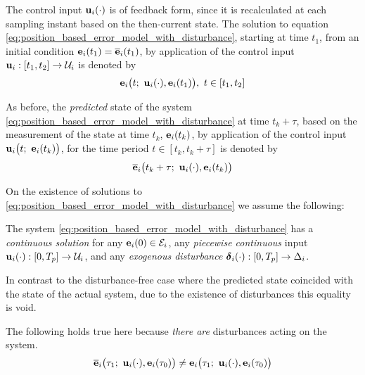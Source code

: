 The control input $\bm{\mathbf{u}}_i(\cdot)$ is of feedback form,
since it is recalculated at each sampling instant based on the then-current
state. The solution to equation \eqref{eq:position_based_error_model_with_disturbance}, starting at time
$t_1$, from an initial condition $\bm{\mathbf{e}}_i(t_1) = \overline{\bm{\mathbf{e}}}_i(t_1)$,
by application of the control input $\bm{\mathbf{u}}_i : [t_1, t_2] \to \mathcal{U}_i$
is denoted by
\begin{align}
  \bm{\mathbf{e}}_i\big(t;\ \bm{\mathbf{u}}_i(\cdot), \bm{\mathbf{e}}_i(t_1)\big),\ t \in [t_1, t_2]
\end{align}

As before, the \textit{predicted} state of the system
\eqref{eq:position_based_error_model_with_disturbance}
at time $t_k + \tau$, based on the measurement of the state at time
$t_k$, $\bm{\mathbf{e}}_i(t_k)$, by application of the control input
$\vect{u}_i\big(t;\ \vect{e}_i(t_k)\big)$, for the time period $t \in [t_k, t_k + \tau]$
is denoted by
\begin{align}
  \overline{\bm{\mathbf{e}}}_i\big(t_k + \tau;\ \bm{\mathbf{u}}_i(\cdot), \bm{\mathbf{e}}_i(t_k)\big) \label{eq:position_based_predicted_error_0_2}
\end{align}

On the existence of solutions to
\eqref{eq:position_based_error_model_with_disturbance} we assume the following:\\[1ex]
\begin{bw_box}
\begin{assumption}
  The system \eqref{eq:position_based_error_model_with_disturbance} has a
  \textit{continuous solution} for any $\bm{\mathbf{e}}_i(0) \in \mathcal{E}_i$,
  any \textit{piecewise continuous} input
  $\bm{\mathbf{u}}_i(\cdot) :[0,T_p] \to \mathcal{U}_i$, and any
  \textit{exogenous disturbance} $\bm{\mathbf{\delta}}_i(\cdot) : [0,T_p] \to \Delta_i$.

  \label{ass:existence_of_solutions_with_disturbance}
\end{assumption}
\end{bw_box}


In contrast to the disturbance-free case where the predicted state coincided
with the state of the actual system, due to the existence of disturbances
this equality is void.\\[1ex]

\begin{bw_box}
\begin{remark}
  The following holds true here because \textit{there are} disturbances
  acting on the system.
  \begin{align}
    \overline{\bm{\mathbf{e}}}_i\big(\tau_1;\ \bm{\mathbf{u}}_i(\cdot), \bm{\mathbf{e}}_i(\tau_0)\big) \not=
    \bm{\mathbf{e}}_i\big(\tau_1;\ \bm{\mathbf{u}}_i(\cdot), \bm{\mathbf{e}}_i(\tau_0)\big)
    \label{eq:error_now_to_predicted_error_2}
  \end{align}
\end{remark}
\end{bw_box}

